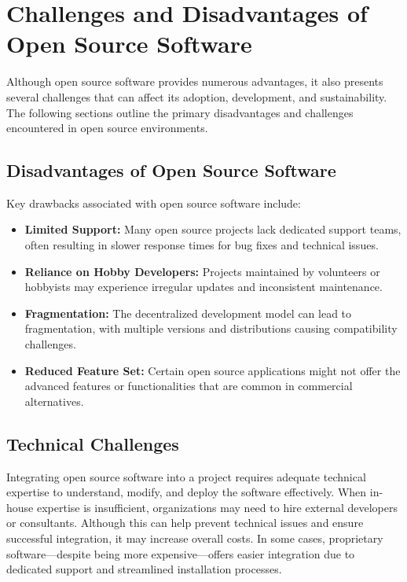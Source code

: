 \cite{forbes_misconceptions_open_source_2024}

\section{Challenges and Disadvantages of Open Source Software}

Although open source software provides numerous advantages, it also presents several challenges that can affect its adoption, development, and sustainability. The following sections outline the primary disadvantages and challenges encountered in open source environments.

\subsection{Disadvantages of Open Source Software}

Key drawbacks associated with open source software include:

\begin{itemize}
    \item \textbf{Limited Support:} Many open source projects lack dedicated support teams, often resulting in slower response times for bug fixes and technical issues.
    \item \textbf{Reliance on Hobby Developers:} Projects maintained by volunteers or hobbyists may experience irregular updates and inconsistent maintenance.
    \item \textbf{Fragmentation:} The decentralized development model can lead to fragmentation, with multiple versions and distributions causing compatibility challenges.
    \item \textbf{Reduced Feature Set:} Certain open source applications might not offer the advanced features or functionalities that are common in commercial alternatives.
\end{itemize}

\cite{OpenSource-Software-Risks-Disadvantages}

\subsection{Technical Challenges}

Integrating open source software into a project requires adequate technical expertise to understand, modify, and deploy the software effectively. When in-house expertise is insufficient, organizations may need to hire external developers or consultants. Although this can help prevent technical issues and ensure successful integration, it may increase overall costs. In some cases, proprietary software—despite being more expensive—offers easier integration due to dedicated support and streamlined installation processes.

